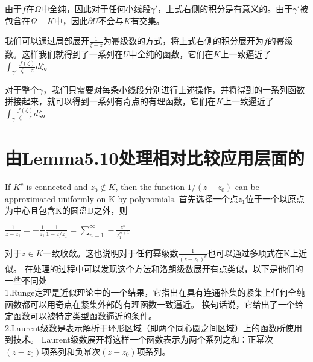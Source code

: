 \documentclass[12pt, a4paper, oneside]{article}
\begin{document}
\begin{spacing}{2.0}
由于$f$在$\Omega$中全纯，因此对于任何小线段$\gamma'$，上式右侧的积分是有意义的。由于$\gamma'$被包含在$\Omega-K$中，因此$\partial U$不会与$K$有交集。

我们可以通过局部展开$\frac{1}{\zeta-z}$为幂级数的方式，将上式右侧的积分展开为$f$的幂级数。这样我们就得到了一系列在$U$中全纯的函数，它们在$K$上一致逼近了$\displaystyle\int_{\gamma'}\frac{f(\zeta)}{\zeta-z}d\zeta$。

对于整个$\gamma$，我们只需要对每条小线段分别进行上述操作，并将得到的一系列函数拼接起来，就可以得到一系列有奇点的有理函数，它们在$K$上一致逼近了$\displaystyle\int_{\gamma}\frac{f(\zeta)}{\zeta-z}d\zeta$。


\section{由Lemma5.10处理相对比较应用层面的}
If $K^c$ is connected and $z_0 \notin K$, then the function $1/(z − z_0)$ can be approximated uniformly on K by polynomials.
首先选择一个点$z_1$位于一个以原点为中心且包含K的圆盘D之外，则
\begin{center}
    $\displaystyle\frac{1}{z-z_1} = -\frac{1}{z_1}\frac{1}{1-z/z_1} = \sum_{n = 1}^{\infty}-\frac{z^n}{z_1^{n+1}}$
\end{center}
对于$z\in K$一致收敛。这也说明对于任何幂级数$\frac{1}{(z-z_1)^k}$也可以通过多项式在K上近似。
在处理的过程中可以发现这个方法和洛朗级数展开有点类似，以下是他们的一些不同处\\
1.Runge定理是近似理论中的一个结果，它指出在具有连通补集的紧集上任何全纯函数都可以用奇点在紧集外部的有理函数一致逼近。
换句话说，它给出了一个给定函数可以被特定类型函数逼近的条件。\\

2.Laurent级数是表示解析于环形区域（即两个同心圆之间区域）上的函数所使用到技术。
Laurent级数展开将这样一个函数表示为两个系列之和：正幂次$(z-z_0)$项系列和负幂次$(z-z_0)$项系列。
\end{spacing}{}



\end{document}
